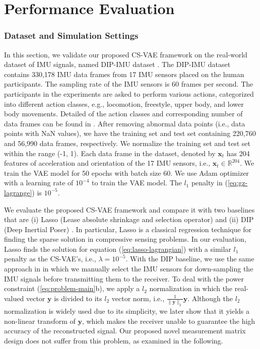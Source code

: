 \documentclass[conference, 10pt]{IEEEtran}
\begin{document}
\vspace{-0.1cm}
\section{Performance Evaluation}
\subsubsection{Dataset and Simulation Settings}
In this section, we validate our proposed CS-VAE framework on the real-world dataset of IMU signals, named DIP-IMU dataset \cite{huang2018deep}. The DIP-IMU dataset contains 330,178 IMU data frames from 17 IMU sensors placed on the human participants. The sampling rate of the IMU sensors is 60 frames per second. The participants in the experiments are asked to perform various actions, categorized into different action classes, e.g., locomotion, freestyle, upper body, and lower body movements. Detailed of the action classes and corresponding number of data frames can be found in \cite{huang2018deep}. After removing abnormal data points (i.e., data points with NaN values), we have the training set and test set containing 220,760 and 56,990 data frames, respectively. We normalize the training set and test set within the range (-1, 1). Each data frame in the dataset, denoted by $\mathbf{x}_t$ has 204 features of acceleration and orientation of the 17 IMU sensors, i.e., $\mathbf{x}_t \in \mathbb{R}^{204}$. We train the VAE model for 50 epochs with batch size 60. We use Adam optimizer with a learning rate of $10^{-4}$ to train the VAE model. The $l_1$ penalty in (\ref{eq:gz-lagrange}) is $10^{-5}$.

We evaluate the proposed CS-VAE framework and compare it with two baselines that are (i) Lasso (Lease absolute shrinkage and selection operator) \cite{foucart2013invitation} and (ii) DIP (Deep Inertial Poser) \cite{huang2018deep}. In particular, Lasso is a classical regression technique for finding the sparse solution in compressive sensing problems. In our evaluation, Lasso finds the solution for equation (\ref{eq:lasso-lagrangian}) with a similar $l_1$ penalty as the CS-VAE's, i.e., $\lambda = 10^{-5}$. With the DIP baseline, we use the same approach in \cite{huang2018deep} in which we manually select the IMU sensors for down-sampling the IMU signals before transmitting them to the receiver. To deal with the power constraint (\ref{eq:problem-main}b), we apply a $l_2$ normalization in which the real-valued vector $\mathbf{y}$ is divided to its $l_2$ vector norm, i.e., $\frac{1}{\|\mathbf{y}\|_2} \mathbf{y}$. Although the $l_2$ normalization is widely used due to its simplicity, we later show that it yields a non-linear transform of $\mathbf{y}$, which makes the receiver unable to guarantee the high accuracy of the reconstructed signal. Our proposed novel measurement matrix design does not suffer from this problem, as examined in the following.
\end{document}
